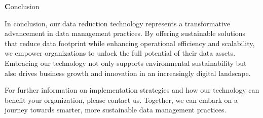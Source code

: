 {\textbf Conclusion}

In conclusion, our data reduction technology represents a transformative advancement in data management practices. By offering sustainable solutions that reduce data footprint while enhancing operational efficiency and scalability, we empower organizations to unlock the full potential of their data assets. Embracing our technology not only supports environmental sustainability but also drives business growth and innovation in an increasingly digital landscape.

For further information on implementation strategies and how our technology can benefit your organization, please contact us. Together, we can embark on a journey towards smarter, more sustainable data management practices.
